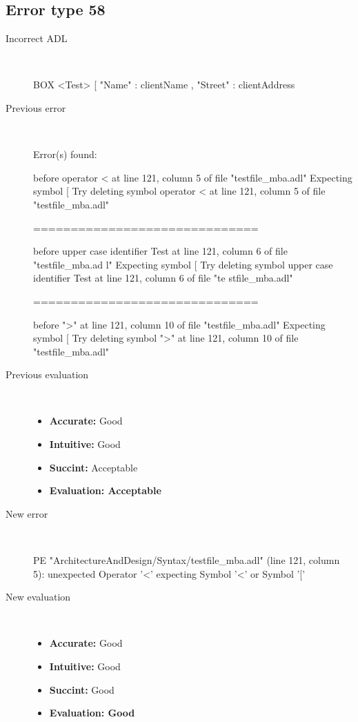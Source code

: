 \hrulefill

\subsection{Error type 58}
  \begin{description}
  \item[Incorrect ADL]~\\
\begin{adl}
BOX <Test> [ "Name"   : clientName
    , "Street" : clientAddress\end{adl}
  \item[Previous error]~\\
\begin{haskell}
Error(s) found:

before operator < at line 121, column 5 of file "testfile_mba.adl"
Expecting symbol [
Try deleting symbol operator < at line 121, column 5 of file "testfile_mba.adl"

==============================

before upper case identifier Test at line 121, column 6 of file "testfile_mba.ad
l"
Expecting symbol [
Try deleting symbol upper case identifier Test at line 121, column 6 of file "te
stfile_mba.adl"

==============================

before ">" at line 121, column 10 of file "testfile_mba.adl"
Expecting symbol [
Try deleting symbol ">" at line 121, column 10 of file "testfile_mba.adl"
\end{haskell}
  \item[Previous evaluation]~\\
    \begin{itemize}
    \item \textbf{Accurate:} Good
    \item \textbf{Intuitive:} Good
    \item \textbf{Succint:} Acceptable
    \item \textbf{Evaluation: Acceptable}
    \end{itemize}
  \item[New error]~\\
\begin{haskell}
PE "ArchitectureAndDesign/Syntax/testfile_mba.adl" (line 121, column 5):
unexpected Operator '<'
expecting Symbol '<' or Symbol '['
\end{haskell}
  \item[New evaluation]~\\
    \begin{itemize}
    \item \textbf{Accurate:} Good
    \item \textbf{Intuitive:} Good
    \item \textbf{Succint:} Good
    \item \textbf{Evaluation: Good
}
    \end{itemize}
  \end{description}

